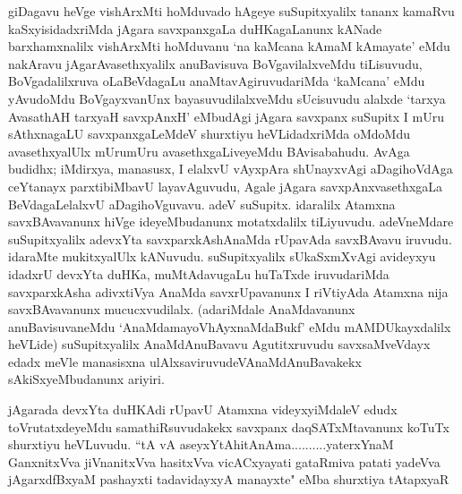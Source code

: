 \begin{artha}
giDagavu heVge vishArxMti hoMduvado hAgeye suSupitxyalilx tananx kamaRvu kaSxyisidadxriMda jAgara savxpanxgaLa duHKagaLanunx kANade barxhamxnalilx vishArxMti hoMduvanu `na kaMcana kAmaM kAmayate' eMdu nakAravu jAgarAvasethxyalilx anuBavisuva BoVgavilalxveMdu tiLisuvudu, BoVgadalilxruva oLaBeVdagaLu anaMtavAgiruvudariMda `kaMcana' eMdu yAvudoMdu BoVgayxvanUnx bayasuvudilalxveMdu sUcisuvudu alalxde `tarxya AvasathAH tarxyaH savxpAnxH' eMbudAgi jAgara savxpanx suSupitx I mUru sAthxnagaLU savxpanxgaLeMdeV shurxtiyu heVLidadxriMda oMdoMdu avasethxyalUlx mUrumUru avasethxgaLiveyeMdu BAvisabahudu. AvAga budidhx; iMdirxya, manasusx, I elalxvU vAyxpAra shUnayxvAgi aDagihoVdAga ceYtanayx parxtibiMbavU layavAguvudu, Agale jAgara savxpAnxvasethxgaLa BeVdagaLelalxvU aDagihoVguvavu. adeV suSupitx. idaralilx Atamxna savxBAvavanunx hiVge ideyeMbudanunx motatxdalilx tiLiyuvudu. adeVneMdare suSupitxyalilx adevxYta savxparxkAshAnaMda rUpavAda savxBAvavu iruvudu. idaraMte mukitxyalUlx kANuvudu. suSupitxyalilx sUkaSxmXvAgi avideyxyu idadxrU devxYta duHKa, muMtAdavugaLu huTaTxde iruvudariMda savxparxkAsha adivxtiVya AnaMda savxrUpavanunx I riVtiyAda Atamxna nija savxBAvavanunx mucucxvudilalx. (adariMdale AnaMdavanunx anuBavisuvaneMdu `AnaMdamayoVhAyxnaMdaBukf' eMdu mAMDUkayxdalilx heVLide) suSupitxyalilx AnaMdAnuBavavu Agutitxruvudu savxsaMveVdayx edadx meVle manasisxna ulAlxsaviruvudeV\break AnaMdAnuBavakekx sAkiSxyeMbudanunx ariyiri. 
\end{artha}


\begin{artha}
jAgarada devxYta duHKAdi rUpavU Atamxna videyxyiMdaleV edudx toVrutatxdeyeMdu samathiRsuvudakekx savxpanx daqSATxMtavanunx koTuTx shurxtiyu heVLuvudu. ``tA vA aseyxYtAhitAnAma..........yaterxYnaM GanxnitxVva jiVnanitxVva hasitxVva vicACxyayati gataRmiva patati yadeVva jAgarxdfBxyaM pashayxti tadavidayxyA manayxte" eMba shurxtiya tAtapxyaR
\end{artha}

